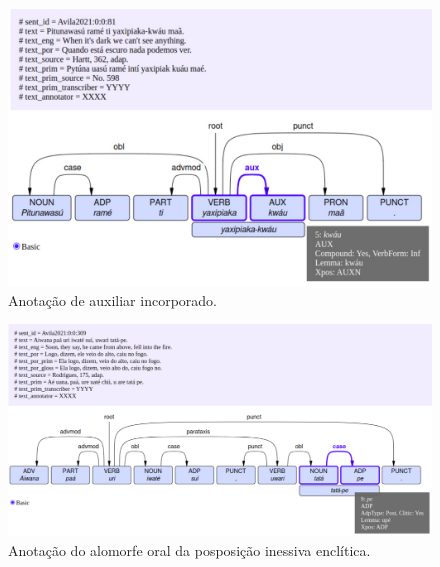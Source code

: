 \documentclass[portuguese]{textolivre}
\begin{document}
\begin{figure}[htbp]
  \centering
  \begin{minipage}{.75\textwidth}
    \includegraphics[width=\linewidth]{figures/aux-incorp.pdf}
    \caption{Anotação de auxiliar incorporado.}
    \label{fig:aux-incorp}
  \end{minipage}
\end{figure}

\begin{figure}[htbp]
  \centering
  \begin{minipage}{.75\textwidth}
    \includegraphics[width=\linewidth]{figures/tata-pe-avila.pdf}
    \caption{Anotação do alomorfe oral da posposição inessiva enclítica.}
    \label{fig:tata-pe-avila}
  \end{minipage}
\end{figure}
\end{document}
